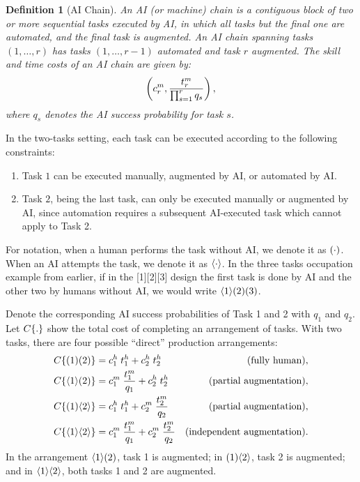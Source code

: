 \documentclass{article}
\theoremstyle{plain}
\theoremstyle{plain}
\newtheorem{definition}[theorem]{Definition}
\begin{document}
\begin{definition}[AI Chain]
\label{def:ai_chain}
An AI (or machine) chain is a contiguous block of two or more sequential tasks executed by AI, in which all tasks but the final one are automated, and the final task is augmented.
An AI chain spanning tasks $(1,\dots,r)$ has tasks $(1,\dots,r-1)$ automated and task $r$ augmented.
The skill and time costs of an AI chain are given by:
\[
\left(c^{m}_{r}, \frac{t^{m}_{r}}{\prod_{s=1}^{r} q_s}\right),
\]
where $q_s$ denotes the AI success probability for task $s$.
\end{definition}

In the two-tasks setting, each task can be executed according to the following constraints:
\begin{enumerate}
\item Task $1$ can be executed manually, augmented by AI, or automated by AI.
\item Task $2$, being the last task, can only be executed manually or augmented by AI, since automation requires a subsequent AI-executed task which cannot apply to Task 2.
\end{enumerate}

For notation, when a human performs the task without AI, we denote it as $( \cdot )$.
When an AI attempts the task, we denote it as $\langle \cdot \rangle$.
In the three tasks occupation example from earlier, if in the [1][2][3] design the first task is done by AI and the other two by humans without AI, we would write $\langle 1 \rangle( 2 )( 3 )$.

Denote the corresponding AI success probabilities of Task 1 and 2 with \(q_1\) and \(q_2\). 
Let $C\{ . \}$ show the total cost of completing an arrangement of tasks.
With two tasks, there are four possible ``direct'' production arrangements:
\begin{align*}
    C\{ ( 1 )( 2 ) \} &= c^{h}_{1} \; t^{h}_{1} + c^{h}_{2} \; t^{h}_{2} & \text{(fully human)}, \\
    C\{ \langle 1 \rangle( 2 ) \} &= c^{m}_{1} \; \frac{t^{m}_{1}}{q_1} + c^{h}_{2} \; t^{h}_{2} & \text{(partial augmentation)}, \\
    C\{ ( 1 )\langle 2 \rangle \} &= c^{h}_{1} \; t^{h}_{1} + c^{m}_{2} \; \frac{t^{m}_{2}}{q_2} & \text{(partial augmentation)}, \\
    C\{ \langle 1 \rangle\langle 2 \rangle \} &= c^{m}_{1} \; \frac{t^{m}_{1}}{q_1} + c^{m}_{2} \; \frac{t^{m}_{2}}{q_2} & \text{(independent augmentation)}.
\end{align*}
In the arrangement $\langle 1 \rangle( 2 )$, task 1 is augmented; in $( 1 )\langle 2 \rangle$, task 2 is augmented; and in $\langle 1 \rangle\langle 2 \rangle$, both tasks 1 and 2 are augmented.  
\end{document}
